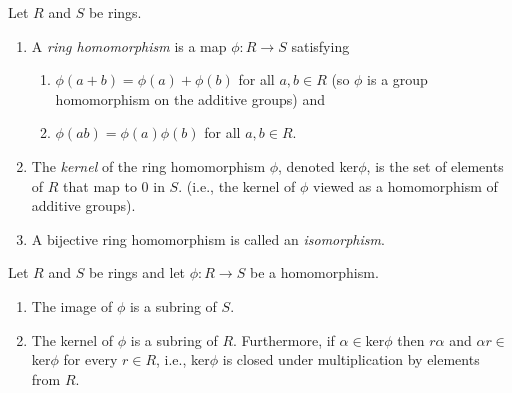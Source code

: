 \documentclass[../main]{subfiles}
\begin{document}
\begin{dfn}
 Let $R$ and $S$ be rings.
 \begin{enumerate}
  \item A \textit{ring homomorphism} is a map $\phi \colon R \to S$ satisfying
  
  \begin{enumerate}
   \item $\phi(a + b) = \phi(a) + \phi(b)$ for all $a,b \in R$ (so $\phi$ is a group homomorphism on the additive groups) and 
   
   \item $\phi(ab) = \phi(a)\phi(b)$ for all $a,b \in R$.
  \end{enumerate}
  
  \item The \textit{kernel} of the ring homomorphism $\phi$, denoted ker$\phi$, is the set of elements of $R$ that map to 0 in $S$. (i.e., the kernel of $\phi$ viewed as a homomorphism of additive groups).
  
  \item A bijective ring homomorphism is called an \textit{isomorphism}.
 \end{enumerate}
\end{dfn}


\begin{prop}
 Let $R$ and $S$ be rings and let $\phi \colon R \to S$ be a homomorphism.
 \begin{enumerate}
  \item The image of $\phi$ is a subring of $S$.
  
  \item The kernel of $\phi$ is a subring of $R$. Furthermore, if $\alpha \in$ker$\phi$ then $r\alpha$ and $\alpha r \in$ker$\phi$ for every $r\in R$, i.e., ker$\phi$ is closed under multiplication by elements from $R$.
 \end{enumerate}
\end{prop}
\end{document}
